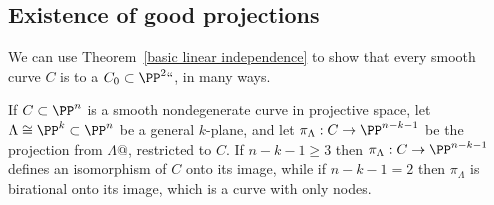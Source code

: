 \subsection*{Existence of good projections}

We can use Theorem~\ref{basic linear independence} to show that every
%
smooth curve $C$ is 
%
%
to a 
$C_0 \subset \PP^2``$, in many ways.

\begin{proposition}\label{nodal projection}
If $C \subset \PP^n$ is a smooth nondegenerate curve in projective space,
let $\Lambda \cong \PP^{k} \subset \PP^n$ be a general $k$-plane, and let
$\pi_\Lambda : C \to \PP^{n-k-1}$ be the projection from $\Lambda@$,
restricted to $C$. If  $n-k-1 \geq 3$
then
$\pi_\Lambda: C \to \PP^{n-k-1}$ defines an isomorphism of $C$ onto
its image, while if $n-k-1 = 2$ then $\pi_\Lambda$
is birational onto its image, which is a curve with only nodes.
\end{proposition}

